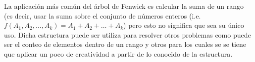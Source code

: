 La aplicación más común del árbol de Fenwick es calcular la suma de un rango (es decir, usar la suma 
sobre el conjunto de números enteros (i.e. $f(A_1, A_2, \dots, A_k) = A_1 + A_2 + \dots + A_k$) pero esto no significa que sea su único uso. Dicha estructura puede ser utiliza para resolver otros problemas como puede ser el conteo de elementos dentro de un rango y otros para los cuales se se tiene que aplicar un poco de creatividad a partir de lo conocido de la estructura.  